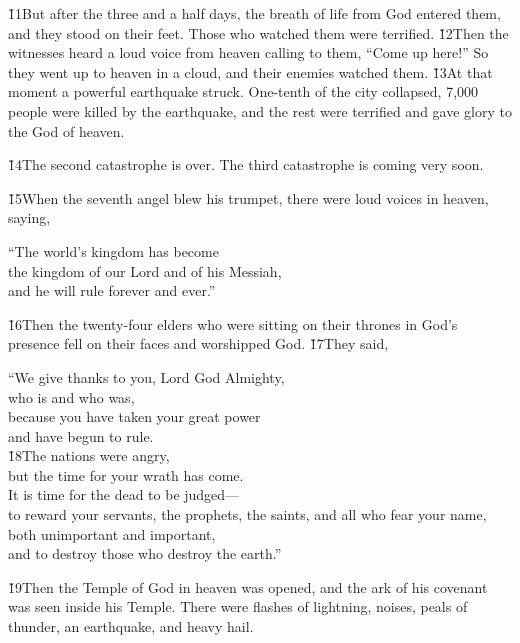 \v{11}But after the three and a half days, the breath of life from God entered them, and they stood on their feet. Those who watched them were terrified. \v{12}Then the witnesses heard a loud voice from heaven calling to them, ``Come up here!'' So they went up to heaven in a cloud, and their enemies watched them. \v{13}At that moment a powerful earthquake struck. One-tenth of the city collapsed, 7,000 people were killed by the earthquake, and the rest were terrified and gave glory to the God of heaven.

\v{14}The second catastrophe is over. The third catastrophe is coming very soon.

\v{15}When the seventh angel blew his trumpet, there were loud voices in heaven, saying,

\begin{poetry}
\poeml ``The world's kingdom has become \\
\poemll    the kingdom of our Lord and of his Messiah, \\
\poemlll       and he will rule forever and ever.''
\end{poetry}

\v{16}Then the twenty-four elders who were sitting on their thrones in God's presence fell on their faces and worshipped God. \v{17}They said,

\begin{poetry}
\poeml ``We give thanks to you, Lord God Almighty, \\
\poemll    who is and who was, \\
\poeml because you have taken your great power \\
\poemll    and have begun to rule. \\
\poeml \v{18}The nations were angry, \\
\poemll    but the time for your wrath has come. \\
\poeml It is time for the dead to be judged--- \\
\poemll    to reward your servants, the prophets, the saints, and all who fear your name, \\
\poemlll       both unimportant and important, \\
\poemll    and to destroy those who destroy the earth.''
\end{poetry}

\v{19}Then the Temple of God in heaven was opened, and the ark of his covenant was seen inside his Temple. There were flashes of lightning, noises, peals of thunder, an earthquake, and heavy hail.

